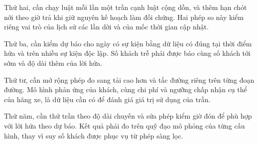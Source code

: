 Thứ hai, cần chạy luật mỗi lần một trần cạnh luật cộng dồn, và thêm hạn chót nới theo giờ trả khi giữ nguyên kế hoạch làm đối chứng. Hai phép so này kiểm riêng vai trò của lịch sử các lần dời và của mốc thời gian cập nhật.

Thứ ba, cần kiểm dự báo cho ngày có sự kiện bằng dữ liệu có đúng tại thời điểm hứa và trên nhiều sự kiện độc lập. Số khách trễ phải được báo cùng số khách tới sớm và độ dài thêm của lời hứa.

Thứ tư, cần mở rộng phép đo sang tải cao hơn và tắc đường riêng trên từng đoạn đường. Mô hình phản ứng của khách, cùng chi phí và ngưỡng chấp nhận cụ thể của hãng xe, là dữ liệu cần có để đánh giá giá trị sử dụng của trần.

Thứ năm, cần thử trần theo độ dài chuyến và sửa phép kiểm giờ đón để phù hợp với lời hứa theo dự báo. Kết quả phải đo trên quỹ đạo mô phỏng của từng cấu hình, thay vì suy số khách được phục vụ từ phép sàng lọc.
